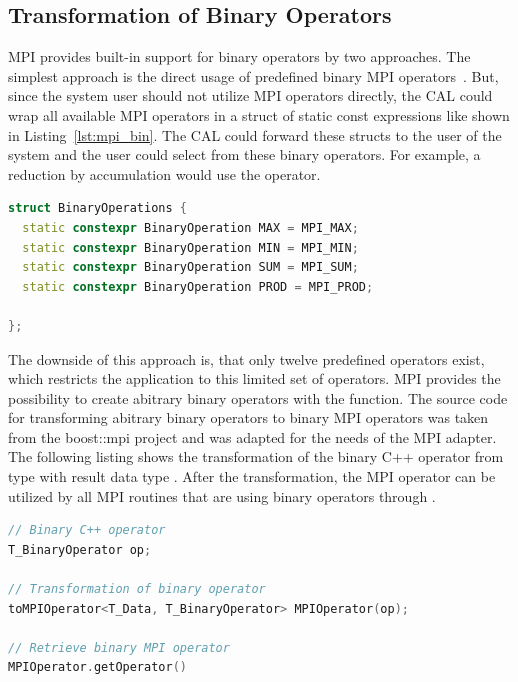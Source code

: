 \subsection{Transformation of Binary Operators}
\label{sec:bin_operator}

MPI provides built-in support for binary operators by two
approaches. The simplest approach is the direct usage of predefined
binary MPI operators~\cite{ref:mpi_bin_op}. But, since the system user
should not utilize MPI operators directly, the CAL could wrap all
available MPI operators in a struct of static const expressions like
shown in Listing~\ref{lst:mpi_bin}.  The CAL could forward these
structs to the user of the system and the user could select from these
binary operators.  For example, a reduction by accumulation would use
the  operator.

\begin{minipage}[t]{\textwidth} 
\begin{lstlisting}[language=C++, caption={A subset of binary operators derived by transforming MPI operations to static const expressions. }, label=lst:mpi_bin]
struct BinaryOperations { 
  static constexpr BinaryOperation MAX = MPI_MAX; 
  static constexpr BinaryOperation MIN = MPI_MIN; 
  static constexpr BinaryOperation SUM = MPI_SUM; 
  static constexpr BinaryOperation PROD = MPI_PROD; 

};
\end{lstlisting}
\end{minipage}


\noindent The downside of this approach is, that only twelve predefined
operators exist, which restricts the application to this limited set of
operators. MPI provides the possibility to create abitrary
binary operators with the  function.  The source
code for transforming abitrary binary operators to binary MPI
operators was taken from the boost::mpi project
\cite{ref:boost_mpi} and was adapted for the needs of the MPI adapter.
The following listing shows the transformation of the binary C++
operator  from type  with result data type
.  After the
transformation, the MPI operator can be utilized by all
MPI routines that are using binary operators through
.

\begin{minipage}[t]{\textwidth} 
\begin{lstlisting}[language=C++, caption={ }, label=lst:mpi_bin2]
// Binary C++ operator
T_BinaryOperator op;  
  
// Transformation of binary operator
toMPIOperator<T_Data, T_BinaryOperator> MPIOperator(op);

// Retrieve binary MPI operator
MPIOperator.getOperator()
\end{lstlisting}
\end{minipage}

